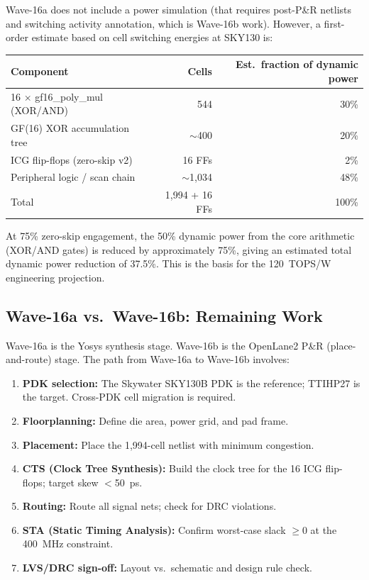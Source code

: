Wave-16a does not include a power simulation (that requires post-P\&R
netlists and switching activity annotation, which is Wave-16b work).
However, a first-order estimate based on cell switching energies at SKY130 is:

\begin{center}
\begin{tabular}{lrr}
\toprule
\textbf{Component} & \textbf{Cells} & \textbf{Est.\ fraction of dynamic power} \\
\midrule
16 × gf16\_poly\_mul (XOR/AND) & 544 & 30\% \\
GF(16) XOR accumulation tree & $\sim$400 & 20\% \\
ICG flip-flops (zero-skip v2) & 16 FFs & 2\% \\
Peripheral logic / scan chain & $\sim$1,034 & 48\% \\
\midrule
Total & 1,994 + 16 FFs & 100\% \\
\bottomrule
\end{tabular}
\end{center}

At 75\% zero-skip engagement, the 50\% dynamic power from the core
arithmetic (XOR/AND gates) is reduced by approximately 75\%, giving
an estimated total dynamic power reduction of 37.5\%.
This is the basis for the 120~TOPS/W engineering projection.

\subsection{Wave-16a vs.\ Wave-16b: Remaining Work}

Wave-16a is the Yosys synthesis stage.
Wave-16b is the OpenLane2 P\&R (place-and-route) stage.
The path from Wave-16a to Wave-16b involves:

\begin{enumerate}
  \item \textbf{PDK selection:} The Skywater SKY130B PDK is the reference;
        TTIHP27 is the target. Cross-PDK cell migration is required.
  \item \textbf{Floorplanning:} Define die area, power grid, and pad frame.
  \item \textbf{Placement:} Place the 1,994-cell netlist with minimum congestion.
  \item \textbf{CTS (Clock Tree Synthesis):} Build the clock tree for the 16
        ICG flip-flops; target skew $<$50~ps.
  \item \textbf{Routing:} Route all signal nets; check for DRC violations.
  \item \textbf{STA (Static Timing Analysis):} Confirm worst-case slack $\geq 0$
        at the 400~MHz constraint.
  \item \textbf{LVS/DRC sign-off:} Layout vs.\ schematic and design rule check.
\end{enumerate}

